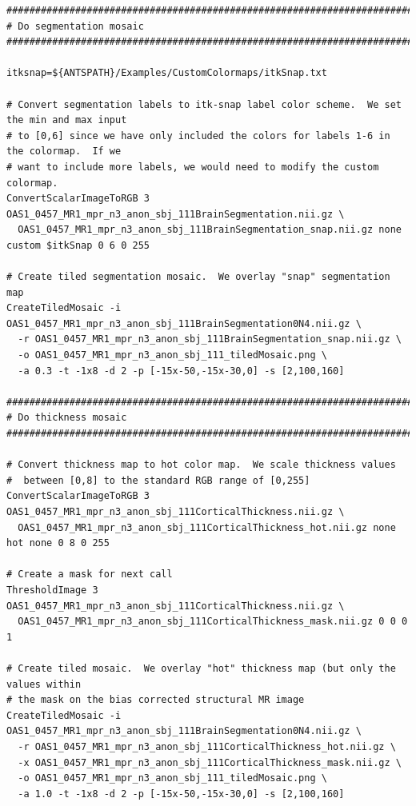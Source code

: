 \documentclass{InsightArticle}
\begin{document}
\begin{lstlisting}
##############################################################################
# Do segmentation mosaic
##############################################################################

itksnap=${ANTSPATH}/Examples/CustomColormaps/itkSnap.txt

# Convert segmentation labels to itk-snap label color scheme.  We set the min and max input 
# to [0,6] since we have only included the colors for labels 1-6 in the colormap.  If we 
# want to include more labels, we would need to modify the custom colormap.
ConvertScalarImageToRGB 3 OAS1_0457_MR1_mpr_n3_anon_sbj_111BrainSegmentation.nii.gz \
  OAS1_0457_MR1_mpr_n3_anon_sbj_111BrainSegmentation_snap.nii.gz none custom $itkSnap 0 6 0 255

# Create tiled segmentation mosaic.  We overlay "snap" segmentation map 
CreateTiledMosaic -i OAS1_0457_MR1_mpr_n3_anon_sbj_111BrainSegmentation0N4.nii.gz \
  -r OAS1_0457_MR1_mpr_n3_anon_sbj_111BrainSegmentation_snap.nii.gz \
  -o OAS1_0457_MR1_mpr_n3_anon_sbj_111_tiledMosaic.png \
  -a 0.3 -t -1x8 -d 2 -p [-15x-50,-15x-30,0] -s [2,100,160]

##############################################################################
# Do thickness mosaic
##############################################################################

# Convert thickness map to hot color map.  We scale thickness values
#  between [0,8] to the standard RGB range of [0,255]
ConvertScalarImageToRGB 3 OAS1_0457_MR1_mpr_n3_anon_sbj_111CorticalThickness.nii.gz \
  OAS1_0457_MR1_mpr_n3_anon_sbj_111CorticalThickness_hot.nii.gz none hot none 0 8 0 255

# Create a mask for next call
ThresholdImage 3 OAS1_0457_MR1_mpr_n3_anon_sbj_111CorticalThickness.nii.gz \
  OAS1_0457_MR1_mpr_n3_anon_sbj_111CorticalThickness_mask.nii.gz 0 0 0 1

# Create tiled mosaic.  We overlay "hot" thickness map (but only the values within
# the mask on the bias corrected structural MR image
CreateTiledMosaic -i OAS1_0457_MR1_mpr_n3_anon_sbj_111BrainSegmentation0N4.nii.gz \
  -r OAS1_0457_MR1_mpr_n3_anon_sbj_111CorticalThickness_hot.nii.gz \
  -x OAS1_0457_MR1_mpr_n3_anon_sbj_111CorticalThickness_mask.nii.gz \
  -o OAS1_0457_MR1_mpr_n3_anon_sbj_111_tiledMosaic.png \
  -a 1.0 -t -1x8 -d 2 -p [-15x-50,-15x-30,0] -s [2,100,160]
\end{lstlisting}
\end{document}

